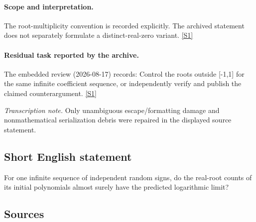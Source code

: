 \documentclass[11pt,a4paper]{article}
\newcommand{\sref}[2]{\hyperlink{source:#1:#2}{[S#2]}}
\begin{document}
\paragraph{Scope and interpretation.}

The root-multiplicity convention is recorded explicitly. The archived statement does not separately formulate a distinct-real-zero variant. \sref{2156}{1}

\paragraph{Residual task reported by the archive.}

The embedded review (2026-08-17) records: Control the roots outside [-1,1] for the same infinite coefficient sequence, or independently verify and publish the claimed counterargument. \sref{2156}{1}

{\small\emph{Transcription note.} Only unambiguous escape/formatting damage and nonmathematical serialization debris were repaired in the displayed source statement.}

\subsection{Short English statement}

For one infinite sequence of independent random signs, do the real-root counts of its initial polynomials almost surely have the predicted logarithmic limit?

\subsection{Sources}
\end{document}
